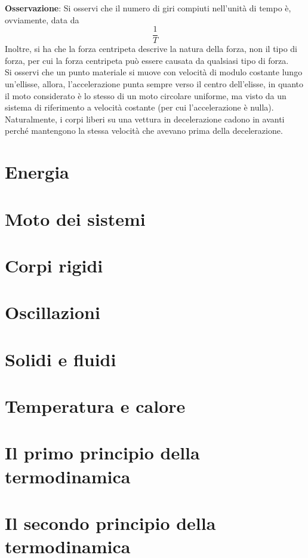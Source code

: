 \documentclass[a4paper]{extarticle}
\begin{document}
\vspace{1em}
\noindent
\textbf{Osservazione}: Si osservi che il numero di giri compiuti nell'unità di tempo è, ovviamente, data da
\[\frac{1}{T}\]
Inoltre, si ha che la forza centripeta descrive la natura della forza, non il tipo di forza, per cui la forza centripeta può essere causata da qualsiasi tipo di forza.\\
Si osservi che un punto materiale si muove con velocità di modulo costante lungo un'ellisse, allora, l'accelerazione punta sempre verso il centro dell'elisse, in quanto il moto considerato è lo stesso di un moto circolare uniforme, ma visto da un sistema di riferimento a velocità costante (per cui l'accelerazione è nulla).\\
Naturalmente, i corpi liberi su una vettura in decelerazione cadono in avanti perché mantengono la stessa velocità che avevano prima della decelerazione.

\newpage
\section{Energia}

\newpage
\section{Moto dei sistemi}

\newpage
\section{Corpi rigidi}

\newpage
\section{Oscillazioni}

\newpage
\section{Solidi e fluidi}

\newpage
\section{Temperatura e calore}

\newpage
\section{Il primo principio della termodinamica}

\newpage
\section{Il secondo principio della termodinamica}
\end{document}
